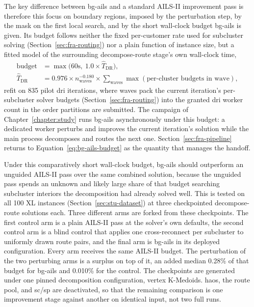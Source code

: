 The key difference between \gls{bg-ails} and a standard AILS-II improvement pass is therefore this focus on boundary regions, imposed by the perturbation step, by the mask on the first local search, and by the short wall-clock budget \gls{bg-ails} is given. Its budget follows neither the fixed per-customer rate used for subcluster solving (Section~\ref{sec:fra-routing}) nor a plain function of instance size, but a fitted model of the surrounding decompose-route stage's own wall-clock time,
\begin{align}
\text{budget} &= \max\bigl(60\text{s},\ 1.0 \times \widehat{T}_{\mathrm{DR}}\bigr), \label{eq:bg-ails-budget}\\
\widehat{T}_{\mathrm{DR}} &= 0.976 \times n_{\mathrm{waves}}^{-0.180} \times \sum_{\text{waves}} \max(\text{per-cluster budgets in wave}), \label{eq:bg-ails-dr-wall}
\end{align}
refit on 835 pilot \gls{dri} iterations, where waves pack the current iteration's per-subcluster solver budgets (Section~\ref{sec:fra-routing}) into the granted \gls{dri} worker count in the order partitions are submitted. The campaign of Chapter~\ref{chapter:study} runs \gls{bg-ails} asynchronously under this budget: a dedicated worker perturbs and improves the current iteration's solution while the main process decomposes and routes the next one. Section~\ref{sec:fra-pipeline} returns to Equation~\ref{eq:bg-ails-budget} as the quantity that manages the handoff.

Under this comparatively short wall-clock budget, \gls{bg-ails} should outperform an unguided AILS-II pass over the same combined solution, because the unguided pass spends an unknown and likely large share of that budget searching subcluster interiors the decomposition had already solved well. This is tested on all 100 XL instances (Section~\ref{sec:stu-dataset}) at three checkpointed decompose-route solutions each. Three different arms are forked from these checkpoints. The first control arm is a plain AILS-II pass at the solver's own defaults, the second control arm is a blind control that applies one cross-reconnect per subcluster to uniformly drawn route pairs, and the final arm is \gls{bg-ails} in its deployed configuration. Every arm receives the same AILS-II budget. The perturbation of the two perturbing arms is a surplus on top of it, an added median 0.28\% of that budget for \gls{bg-ails} and 0.010\% for the control. The checkpoints are generated under one pinned decomposition configuration, vertex K-Medoids. \gls{haos}, the route pool, and \gls{sc}/\gls{sp} are deactivated, so that the remaining comparison is one improvement stage against another on identical input, not two full runs.

